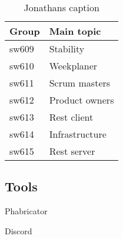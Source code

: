 \begin{table}[H]
\centering
\caption{Jonathans caption}
\label{Jonathans-label}
\begin{tabular}{|l|l|}
\hline
Group & Main topic \\ \hline
sw609 & Stability \\ \hline
sw610 & Weekplaner \\ \hline
sw611 & Scrum masters \\ \hline
sw612 & Product owners \\ \hline
sw613 & Rest client \\ \hline
sw614 & Infrastructure \\ \hline
sw615 & Rest server \\ \hline
\end{tabular}
\end{table}





\subsection{Tools}

Phabricator

Discord

